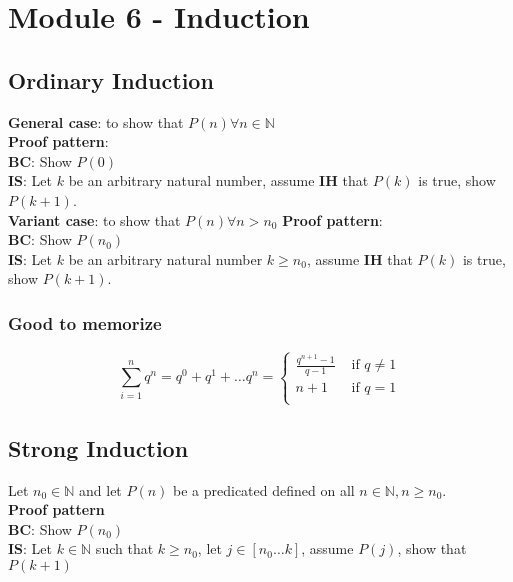\chapter{Module 6 - Induction}

\section{Ordinary Induction}
\begin{framed}

   \textbf{General case}: to show that $P(n) \forall n \in \mathbb{N}$ \\
   
   \textbf{Proof pattern}: \\
   \textbf{BC}: Show $P(0)$ \\
   \textbf{IS}: Let $k$ be an arbitrary natural number, assume \textbf{IH} that $P(k)$ is true, show $P(k + 1)$.  \\

   \textbf{Variant case}: to show that $P(n) \forall n > n_0$ 
   \textbf{Proof pattern}: \\
   \textbf{BC}: Show $P(n_0)$ \\
   \textbf{IS}: Let $k$ be an arbitrary natural number $k \geq n_0$, assume \textbf{IH} that $P(k)$ is true, show $P(k + 1)$.  \\

\end{framed}

\subsection{Good to memorize}

\[
   \sum_{i = 1}^{n} q^n = q^0 + q^1 + \hdots q^n = 
   \begin{cases}
      \frac{q^{n + 1} - 1}{q - 1} & \text{ if } q \neq 1 \\
      n + 1 & \text{ if } q = 1 \\
   \end{cases}
\] 

\section{Strong Induction}

\begin{framed}
Let $n_0 \in \mathbb{N}$  and let $P(n)$ be a predicated defined on all $n \in \mathbb{N}, n \geq n_0$.  \\

\textbf{Proof pattern} \\

\textbf{BC}: Show $P(n_0) $ \\

\textbf{IS}: Let $k \in \mathbb{N}$ such that $ k \geq n_0$, let $j \in [n_0 \hdots k]$, assume $P(j)$, show that  $P(k + 1) $
\end{framed}

